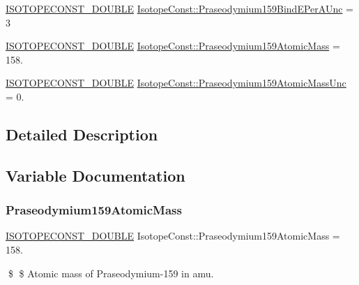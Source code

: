 \begin{DoxyCompactItemize}
\item 
\mbox{\hyperlink{group___isotope_const-_macros_ga8f45a7272ce02c0b4c65c44636ed719a}{I\+S\+O\+T\+O\+P\+E\+C\+O\+N\+S\+T\+\_\+\+D\+O\+U\+B\+LE}} \mbox{\hyperlink{group___isotope_const-_praseodymium-_pr159_ga4fa2d6150a78568e599cfd197d364b92}{Isotope\+Const\+::\+Praseodymium159\+Bind\+E\+Per\+A\+Unc}} = 3
\item 
\mbox{\hyperlink{group___isotope_const-_macros_ga8f45a7272ce02c0b4c65c44636ed719a}{I\+S\+O\+T\+O\+P\+E\+C\+O\+N\+S\+T\+\_\+\+D\+O\+U\+B\+LE}} \mbox{\hyperlink{group___isotope_const-_praseodymium-_pr159_gaefefc9d9dba2990aed685089f82c2793}{Isotope\+Const\+::\+Praseodymium159\+Atomic\+Mass}} = 158.
\item 
\mbox{\hyperlink{group___isotope_const-_macros_ga8f45a7272ce02c0b4c65c44636ed719a}{I\+S\+O\+T\+O\+P\+E\+C\+O\+N\+S\+T\+\_\+\+D\+O\+U\+B\+LE}} \mbox{\hyperlink{group___isotope_const-_praseodymium-_pr159_ga6452df8e4027d10edad8485a92eef0de}{Isotope\+Const\+::\+Praseodymium159\+Atomic\+Mass\+Unc}} = 0.
\end{DoxyCompactItemize}


\subsection{Detailed Description}


\subsection{Variable Documentation}
\mbox{\label{group___isotope_const-_praseodymium-_pr159_gaefefc9d9dba2990aed685089f82c2793}} 
\subsubsection{\texorpdfstring{Praseodymium159\+Atomic\+Mass}{Praseodymium159AtomicMass}}
{\footnotesize\ttfamily \mbox{\hyperlink{group___isotope_const-_macros_ga8f45a7272ce02c0b4c65c44636ed719a}{I\+S\+O\+T\+O\+P\+E\+C\+O\+N\+S\+T\+\_\+\+D\+O\+U\+B\+LE}} Isotope\+Const\+::\+Praseodymium159\+Atomic\+Mass = 158.}

\$ \$ Atomic mass of Praseodymium-\/159 in amu. \mbox{\label{group___isotope_const-_praseodymium-_pr159_ga6452df8e4027d10edad8485a92eef0de}} 
